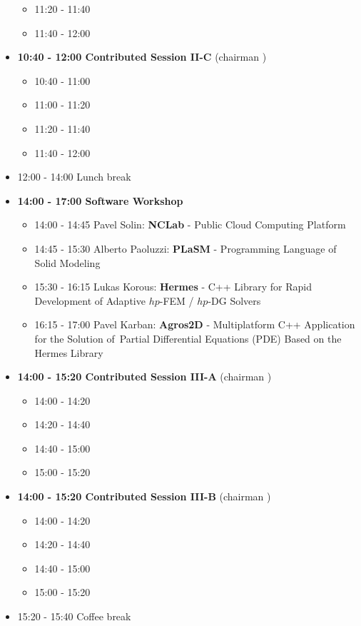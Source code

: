 \documentclass[10pt, A4]{article}%
\begin{document}
\begin{itemize}
\begin{itemize}
    \item 11:20 - 11:40 
    \item 11:40 - 12:00  
  \end{itemize}
  \item {\bf 10:40 - 12:00 Contributed Session II-C} (chairman ) 
  \begin{itemize}
    \item 10:40 - 11:00
    \item 11:00 - 11:20 
    \item 11:20 - 11:40 
    \item 11:40 - 12:00 
  \end{itemize}
  \item 12:00 - 14:00 Lunch break
  \item {\bf 14:00 - 17:00 Software Workshop}
  \begin{itemize}
    \item 14:00 - 14:45 Pavel Solin: {\bf NCLab} - Public Cloud Computing Platform
    \item 14:45 - 15:30 Alberto Paoluzzi: {\bf PLaSM} - Programming Language of Solid Modeling
    \item 15:30 - 16:15 Lukas Korous: {\bf Hermes} - C++ Library for Rapid Development of Adaptive $hp$-FEM / $hp$-DG Solvers
    \item 16:15 - 17:00 Pavel Karban: {\bf Agros2D} - Multiplatform C++ Application for the Solution of~Partial Differential Equations (PDE) Based on the Hermes Library  
  \end{itemize}
  \item {\bf 14:00 - 15:20 Contributed Session III-A} (chairman ) 
  \begin{itemize}
    \item 14:00 - 14:20 
    \item 14:20 - 14:40 
    \item 14:40 - 15:00
    \item 15:00 - 15:20  
  \end{itemize}
  \item {\bf 14:00 - 15:20 Contributed Session III-B} (chairman ) 
  \begin{itemize}
    \item 14:00 - 14:20 
    \item 14:20 - 14:40 
    \item 14:40 - 15:00
    \item 15:00 - 15:20  
  \end{itemize}
  \item 15:20 - 15:40 Coffee break

\end{itemize}
\end{document}
